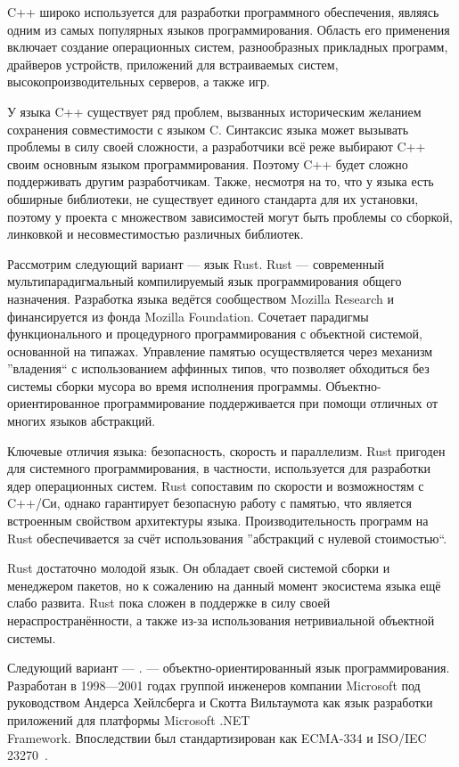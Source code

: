 C++ широко используется для разработки программного обеспечения, являясь одним из самых популярных языков программирования. Область его применения включает создание операционных систем, разнообразных прикладных программ, драйверов устройств, приложений для встраиваемых систем, высокопроизводительных серверов, а также игр.

У языка C++ существует ряд проблем, вызванных историческим желанием сохранения совместимости с языком C. Синтаксис языка может вызывать проблемы в силу своей сложности, а разработчики всё реже выбирают C++ своим основным языком программирования. Поэтому C++ будет сложно поддерживать другим разработчикам. Также, несмотря на то, что у языка есть обширные библиотеки, не существует единого стандарта для их установки, поэтому у проекта с множеством зависимостей могут быть проблемы со сборкой, линковкой и несовместимостью различных библиотек.


Рассмотрим следующий вариант — язык Rust. Rust — современный мультипарадигмальный компилируемый язык программирования общего назначения. Разработка языка ведётся сообществом Mozilla Research и финансируется из фонда Mozilla Foundation. Сочетает парадигмы функционального и процедурного программирования с объектной системой, основанной на типажах. Управление памятью осуществляется через механизм ''владения`` с использованием аффинных типов, что позволяет обходиться без системы сборки мусора во время исполнения программы. Объектно-ориентированное программирование поддерживается при помощи отличных от многих языков абстракций.

Ключевые отличия языка: безопасность, скорость и параллелизм. Rust пригоден для системного программирования, в частности, используется для разработки ядер операционных систем. Rust сопоставим по скорости и возможностям с C++/Си, однако гарантирует безопасную работу с памятью, что является встроенным свойством архитектуры языка. Производительность программ на Rust обеспечивается за счёт использования ''абстракций с нулевой стоимостью``.

Rust достаточно молодой язык. Он обладает своей системой сборки и менеджером пакетов, но к сожалению на данный момент экосистема языка ещё слабо развита. Rust пока сложен в поддержке в силу своей нераспространённости, а также из-за использования нетривиальной объектной системы.


Следующий вариант — \csharp. \csharp — объектно-ориентированный язык программирования. Разработан в 1998—2001 годах группой инженеров компании Microsoft под руководством Андерса Хейлсберга и Скотта Вильтаумота как язык разработки приложений для платформы Microsoft .NET \\Framework. Впоследствии был стандартизирован как ECMA-334 и ISO/IEC 23270~\cite{wiki_dodiez}.

